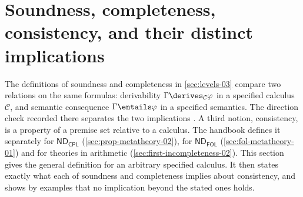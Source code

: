 \section{Soundness, completeness, consistency, and their distinct implications}
\label{sec:p01-w02-p01-019-consistency}

The definitions of soundness and completeness in \cref{sec:levels-03} compare
two relations on the same formulas: derivability \(\Gamma\derives_{\mathcal
C}\varphi\) in a specified calculus \(\mathcal C\), and semantic consequence
\(\Gamma\entails\varphi\) in a specified semantics. The direction check
recorded there separates the two implications
\cite[ch.~``Levels, Objects, and Consequence'', definitions ``Soundness'' and
``Completeness'', warning ``Direction check'']{FrozenFormalLogicConsistencyComparison}.
A third notion, consistency, is a property of a premise set relative to a
calculus. The handbook defines it separately for \(\mathsf{ND}_{\mathsf{CPL}}\)
(\cref{sec:prop-metatheory-02}), for \(\mathsf{ND}_{\mathsf{FOL}}\)
(\cref{sec:fol-metatheory-01}) and for theories in arithmetic
(\cref{sec:first-incompleteness-02}). This section gives the general
definition for an arbitrary specified calculus. It then states exactly what each
of soundness and completeness implies about consistency, and shows by
examples that no implication beyond the stated ones holds.

